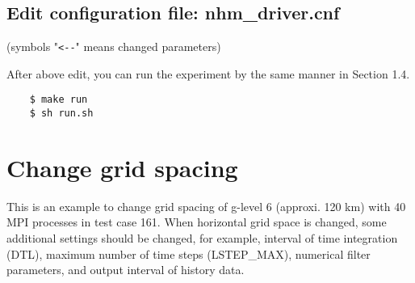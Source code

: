 \subsection{Edit configuration file: nhm\_driver.cnf}
 (symbols "\verb|<--|" means changed parameters)

 \noindent After above edit, you can run the experiment
 by the same manner in Section 1.4.
 \begin{verbatim}
    $ make run
    $ sh run.sh
 \end{verbatim}


\section{Change grid spacing}
 \noindent This is an example to change grid spacing of g-level 6
 (approxi. 120 km) with 40 MPI processes in test case 161.
 When horizontal grid space is changed, some additional settings
 should be changed, for example, interval of time integration (DTL),
 maximum number of time steps (LSTEP\_MAX), numerical filter parameters,
 and output interval of history data.


